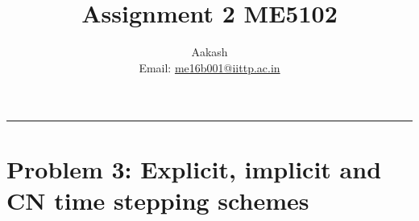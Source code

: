 \documentclass[11pt]{article}
\title{Assignment 2 ME5102}
\author{Aakash \\ Email: \href{mailto:me16b001@iittp.ac.in}{me16b001@iittp.ac.in}}
\begin{document}
    
    
    \maketitle
    
    

    
    \begin{center}\rule{0.5\linewidth}{\linethickness}\end{center}

\section*{Problem 3: Explicit, implicit and CN time stepping
schemes}\label{problem-3-explicit-implicit-and-cn-time-stepping-schemes}
    \vspace{400px}
\end{document}
